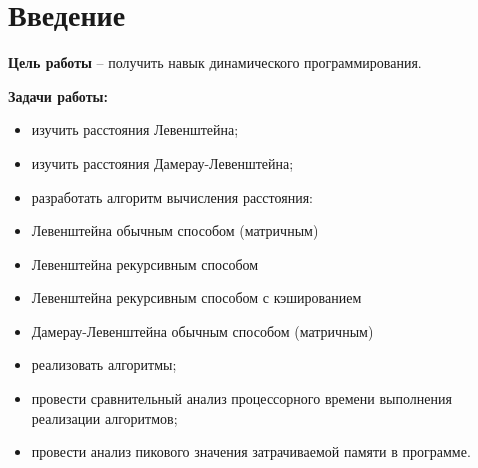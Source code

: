 \chapter*{Введение}
\textbf{Цель работы} – получить навык динамического программирования.

\textbf{Задачи работы:}
\begin{itemize}
	\item изучить расстояния Левенштейна;
	\item изучить расстояния Дамерау-Левенштейна;
	\item разработать алгоритм вычисления расстояния:
		\item Левенштейна обычным способом (матричным)
		\item Левенштейна рекурсивным способом
		\item Левенштейна рекурсивным способом с кэшированием
		\item Дамерау-Левенштейна обычным способом (матричным)
	\item реализовать алгоритмы;
	\item провести сравнительный анализ процессорного времени выполнения реализации алгоритмов;
	\item провести анализ пикового значения затрачиваемой памяти в программе.
\end{itemize}